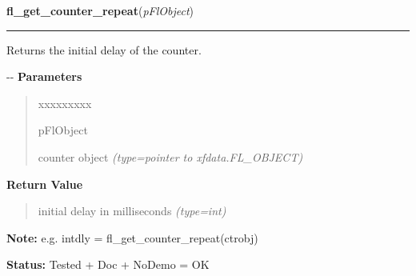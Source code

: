     \label{xformslib:flcounter:fl_get_counter_repeat}

    \vspace{0.5ex}

\hspace{.8\funcindent}\begin{boxedminipage}{\funcwidth}

    \raggedright \textbf{fl\_get\_counter\_repeat}(\textit{pFlObject})

    \vspace{-1.5ex}

    \rule{\textwidth}{0.5\fboxrule}
\setlength{\parskip}{2ex}

Returns the initial delay of the counter.

-{}-
\setlength{\parskip}{1ex}
      \textbf{Parameters}
      \vspace{-1ex}

      \begin{quote}
        \begin{Ventry}{xxxxxxxxx}

          \item[pFlObject]


counter object
            {\it (type=pointer to xfdata.FL\_OBJECT)}

        \end{Ventry}

      \end{quote}

      \textbf{Return Value}
    \vspace{-1ex}

      \begin{quote}

initial delay in milliseconds
      {\it (type=int)}

      \end{quote}

\textbf{Note:} 
e.g. intdly = fl\_get\_counter\_repeat(ctrobj)


\textbf{Status:} 
Tested + Doc + NoDemo = OK


    \end{boxedminipage}

    \label{xformslib:flcounter:fl_set_counter_repeat}

